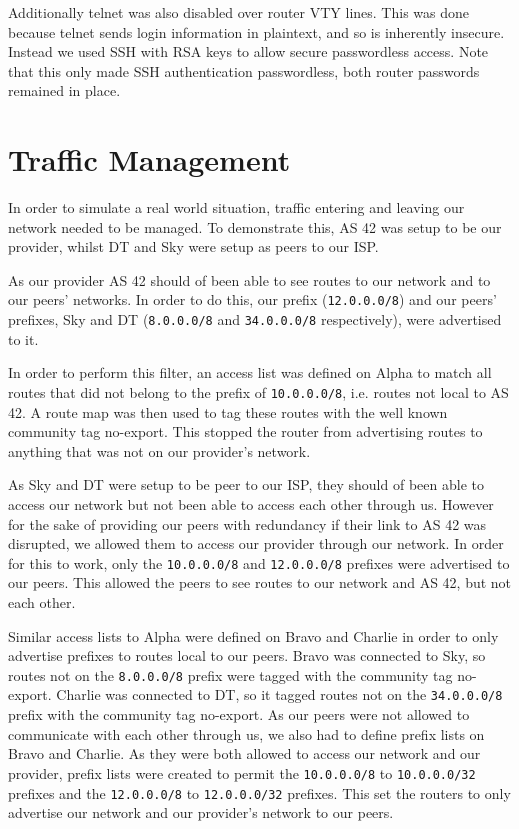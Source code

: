 Additionally telnet was also disabled over router VTY lines. This was done
because telnet sends login information in plaintext, and so is inherently
insecure. Instead we used SSH with RSA keys to allow secure passwordless
access. Note that this only made SSH authentication passwordless, both router
passwords remained in place.

\section{Traffic Management}
In order to simulate a real world situation, traffic entering and leaving our
network needed to be managed. To demonstrate this, AS 42 was setup to
be our provider, whilst DT and Sky were setup as peers to our ISP.

As our provider AS 42 should of been able to see routes to our network and to
our peers' networks. In order to do this, our prefix (\texttt {12.0.0.0/8}) and
our peers' prefixes, Sky and DT (\texttt{8.0.0.0/8} and
\texttt{34.0.0.0/8} respectively), were advertised to it.

In order to perform this filter, an access list was defined on Alpha to match
all routes that did not belong to the prefix of \texttt{10.0.0.0/8}, i.e.
routes not local to AS 42. A route map was then used to tag these routes with
the well known community tag no-export. This stopped the router from
advertising routes to anything that was not on our provider's network.

As Sky and DT were setup to be peer to our ISP, they should of been able to
access our network but not been able to access each other through us. However
for the sake of providing our peers with redundancy if their link to AS 42 was
disrupted, we allowed them to access our provider through our network. In order
for this to work, only the \texttt{10.0.0.0/8} and \texttt{12.0.0.0/8} prefixes
were advertised to our peers. This allowed the peers to see routes to our
network and AS 42, but not each other.

Similar access lists to Alpha were defined on Bravo and Charlie in order to
only advertise prefixes to routes local to our peers. Bravo was connected to
Sky, so routes not on the \texttt{8.0.0.0/8} prefix were tagged with the
community tag no-export. Charlie was connected to DT, so it tagged routes not
on the \texttt{34.0.0.0/8} prefix with the community tag no-export. As our
peers were not allowed to communicate with each other through us, we also had
to define prefix lists on Bravo and Charlie. As they were both allowed to
access our network and our provider, prefix lists were created to permit the
\texttt{10.0.0.0/8} to \texttt{10.0.0.0/32} prefixes and the
\texttt{12.0.0.0/8} to \texttt{12.0.0.0/32} prefixes. This set the routers to
only advertise our network and our provider's network to our peers.

